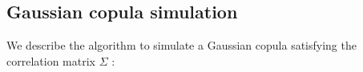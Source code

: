 \documentclass[a4paper,12pt,final]{article}
\begin{document}

\subsection{Gaussian copula simulation}
\label{ap:gaussiancopu}

We describe the algorithm to simulate a Gaussian copula satisfying the correlation 
matrix $\Sigma$ \cite{copu:wang} \cite{copu:pricing}:
\end{document}
